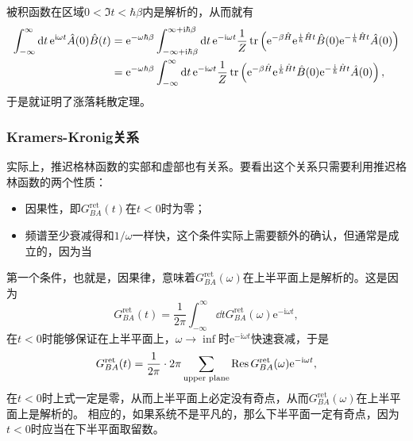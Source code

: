 \documentclass[hyperref, UTF8, a4paper]{ctexart}
\newcommand*{\ii}{\mathrm{i}}
\newcommand*{\ee}{\mathrm{e}}
\begin{document}
被积函数在区域$0 < \Im t < \hbar \beta$内是解析的，从而就有
\[
    \begin{aligned}
        \int_{-\infty}^\infty \dd{t} \ee^{\ii \omega t} \hat{A}(0) \hat{B}(t)  &= \ee^{-\omega \hbar \beta} \int_{-\infty+\ii\hbar\beta}^{\infty+\ii\hbar\beta} \dd{t} \ee^{-\ii \omega t} \frac{1}{Z} \trace \left( \ee^{-\beta \hat{H}} \ee^{\frac{\ii}{\hbar} \hat{H} t} \hat{B}(0) \ee^{ - \frac{\ii}{\hbar} \hat{H} t} \hat{A}(0) \right) \\
        &= \ee^{-\omega \hbar \beta} \int_{-\infty}^{\infty} \dd{t} \ee^{-\ii \omega t} \frac{1}{Z} \trace \left( \ee^{-\beta \hat{H}} \ee^{\frac{\ii}{\hbar} \hat{H} t} \hat{B}(0) \ee^{ - \frac{\ii}{\hbar} \hat{H} t} \hat{A}(0) \right),
    \end{aligned}
\]
于是就证明了涨落耗散定理。

\subsubsection{Kramers-Kronig关系}

实际上，推迟格林函数的实部和虚部也有关系。要看出这个关系只需要利用推迟格林函数的两个性质：
\begin{itemize}
    \item 因果性，即$G_{BA}^\text{ret}(t)$在$t<0$时为零；
    \item 频谱至少衰减得和$1/\omega$一样快，这个条件实际上需要额外的确认，但通常是成立的，因为当
\end{itemize}

第一个条件，也就是，因果律，意味着$G_{BA}^\text{ret}(\omega)$在上半平面上是解析的。这是因为
\[
    G_{BA}^\text{ret}(t) = \frac{1}{2\pi} \int_{-\infty}^\infty \dd{t} G_{BA}^\text{ret}(\omega) \ee^{-\ii\omega t},
\]
在$t<0$时能够保证在上半平面上，$\omega\to\inf$时$\ee^{-\ii \omega t}$快速衰减，于是
\[
    G_{BA}^\text{ret}(t) = \frac{1}{2\pi} \cdot 2 \pi \sum_\text{upper plane}  \Res G_{BA}^\text{ret}(\omega) \ee^{-\ii\omega t},
\]
在$t<0$时上式一定是零，从而上半平面上必定没有奇点，从而$G_{BA}^\text{ret}(\omega)$在上半平面上是解析的。
相应的，如果系统不是平凡的，那么下半平面一定有奇点，因为$t<0$时应当在下半平面取留数。
\end{document}
